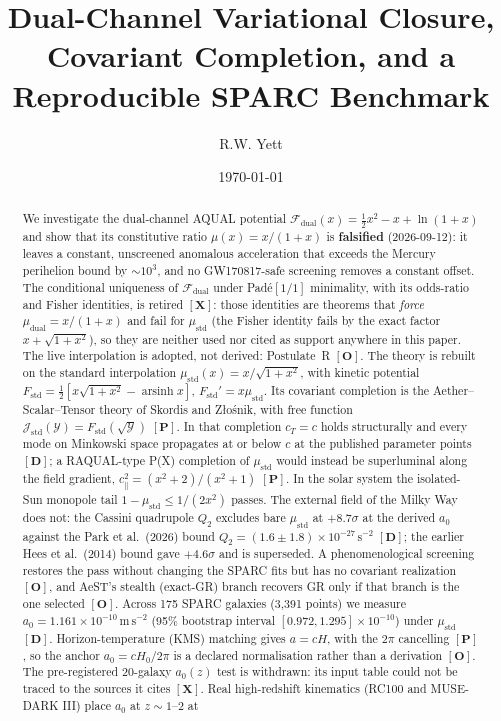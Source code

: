 \documentclass[aps,prd,preprint,superscriptaddress,nofootinbib,amsmath,amssymb,floatfix]{revtex4-2}
\makeatletter
\DeclareRobustCommand{\_}{%
    \ifmmode\nfss@text{\textunderscore}\else\textunderscore\penalty\z@\fi}%
\makeatother
\begin{document}


\title{Dual-Channel Variational Closure, Covariant Completion, and a Reproducible SPARC Benchmark}

\author{R.W. Yett}

\date{\today}

\begin{abstract}
We investigate the dual-channel AQUAL potential $\mathcal{F}_{\text{dual}}(x) = \tfrac{1}{2}x^2 - x + \ln(1+x)$ and show that its constitutive ratio $\mu(x) = x/(1+x)$ is \textbf{falsified} (2026-09-12): it leaves a constant, unscreened anomalous acceleration that exceeds the Mercury perihelion bound by $\sim10^3$, and no GW170817-safe screening removes a constant offset. The conditional uniqueness of $\mathcal{F}_{\text{dual}}$ under Pad\'e$[1/1]$ minimality, with its odds-ratio and Fisher identities, is retired $\mathbf{[X]}$: those identities are theorems that \emph{force} $\mu_{\text{dual}} = x/(1+x)$ and fail for $\mu_{\text{std}}$ (the Fisher identity fails by the exact factor $x+\sqrt{1+x^2}$), so they are neither used nor cited as support anywhere in this paper. The live interpolation is adopted, not derived: Postulate~R $\mathbf{[O]}$. The theory is rebuilt on the standard interpolation $\mu_{\text{std}}(x) = x/\sqrt{1+x^2}$, with kinetic potential $F_{\text{std}} = \tfrac12[x\sqrt{1+x^2} - \operatorname{arsinh} x]$, $F_{\text{std}}' = x\mu_{\text{std}}$. Its covariant completion is the Aether--Scalar--Tensor theory of Skordis and Z\l{}o\'snik, with free function $\mathcal{J}_{\text{std}}(\mathcal{Y}) = F_{\text{std}}(\sqrt{\mathcal{Y}})$ $\mathbf{[P]}$. In that completion $c_T = c$ holds structurally and every mode on Minkowski space propagates at or below $c$ at the published parameter points $\mathbf{[D]}$; a RAQUAL-type P(X) completion of $\mu_{\text{std}}$ would instead be superluminal along the field gradient, $c_\parallel^2 = (x^2+2)/(x^2+1)$ $\mathbf{[P]}$. In the solar system the isolated-Sun monopole tail $1-\mu_{\text{std}} \le 1/(2x^2)$ passes. The external field of the Milky Way does not: the Cassini quadrupole $Q_2$ excludes bare $\mu_{\text{std}}$ at $+8.7\sigma$ at the derived $a_0$ against the Park et al.\ (2026) bound $Q_2=(1.6\pm1.8)\times10^{-27}\,\mathrm{s^{-2}}$ \cite{Park2026} $\mathbf{[D]}$; the earlier Hees et al.\ (2014) bound \cite{Hees2014} gave $+4.6\sigma$ and is superseded. A phenomenological screening restores the pass without changing the SPARC fits but has no covariant realization $\mathbf{[O]}$, and AeST's stealth (exact-GR) branch recovers GR only if that branch is the one selected $\mathbf{[O]}$. Across 175 SPARC galaxies (3,391 points) we measure $a_0 = 1.161\times10^{-10}\,\mathrm{m\,s^{-2}}$ (95\% bootstrap interval $[0.972, 1.295]\times10^{-10}$) under $\mu_{\text{std}}$ $\mathbf{[D]}$. Horizon-temperature (KMS) matching gives $a = cH$, with the $2\pi$ cancelling $\mathbf{[P]}$, so the anchor $a_0 = cH_0/2\pi$ is a declared normalisation rather than a derivation $\mathbf{[O]}$. The pre-registered 20-galaxy $a_0(z)$ test is withdrawn: its input table could not be traced to the sources it cites $\mathbf{[X]}$. Real high-redshift kinematics (RC100 and MUSE-DARK III) place $a_0$ at $z\sim1$--$2$ at 
\end{abstract}
\end{document}
